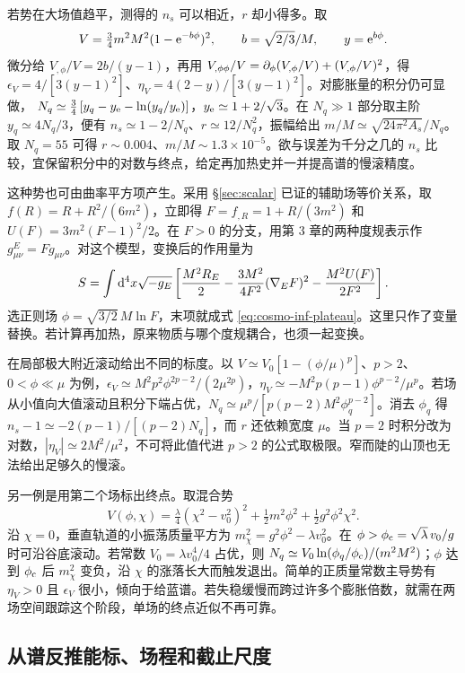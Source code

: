 若势在大场值趋平，测得的 $n_s$ 可以相近，$r$ 却小得多。取
\begin{equation}\label{eq:cosmo-inf-plateau}
 V=\tfrac34 m^2M^2(1-\mathrm{e}^{-b\phi})^2,\qquad b=\sqrt{2/3}/M,\qquad
 y=\mathrm{e}^{b\phi}.
\end{equation}
微分给 $V_{,\phi}/V=2b/(y-1)$，再用 $V_{,\phi\phi}/V=\partial_\phi(V_{,\phi}/V)+(V_{,\phi}/V)^2$，得 $\epsilon_V=4/[3(y-1)^2]$、$\eta_V=4(2-y)/[3(y-1)^2]$。对膨胀量的积分仍可显做， $N_q\simeq \tfrac34\left[y_q-y_{\rm e}-\ln(y_q/y_{\rm e})\right]$，$y_{\rm e}\simeq1+2/\sqrt3$。在 $N_q\gg1$ 部分取主阶 $y_q\simeq4N_q/3$，便有 $n_s\simeq1-2/N_q$、$r\simeq12/N_q^2$，振幅给出 $m/M\simeq\sqrt{24\pi^2 A_s}/N_q$。取 $N_q=55$ 可得 $r\sim0.004$、$m/M\sim1.3\times10^{-5}$。欲与误差为千分之几的 $n_s$ 比较，宜保留积分中的对数与终点，给定再加热史并一并提高谱的慢滚精度。

这种势也可由曲率平方项产生。采用 \S\ref{sec:scalar} 已证的辅助场等价关系，取 $f(R)=R+R^2/(6m^2)$，立即得 $F=f_{,R}=1+R/(3m^2)$ 和 $U(F)=3m^2(F-1)^2/2$。在 $F>0$ 的分支，用第 3 章的两种度规表示作 $g^{E}_{\mu\nu}=F g_{\mu\nu}$。对这个模型，变换后的作用量为
\[
 S=\int \dd^4x\sqrt{-g_E}\left[
   \frac{M^2R_E}{2}-\frac{3M^2}{4F^2}(\nabla_E F)^2
   -\frac{M^2U(F)}{2F^2}\right].
\]
选正则场 $\phi=\sqrt{3/2}\,M\ln F$，末项就成式 \eqref{eq:cosmo-inf-plateau}。这里只作了变量替换。若计算再加热，原来物质与哪个度规耦合，也须一起变换。

在局部极大附近滚动给出不同的标度。以 $V\simeq V_0[1-(\phi/\mu)^p]$、$p>2$、$0<\phi\ll\mu$ 为例，$\epsilon_V\simeq M^2p^2\phi^{2p-2}/(2\mu^{2p})$，$\eta_V\simeq-M^2p(p-1)\phi^{p-2}/\mu^p$。若场从小值向大值滚动且积分下端占优，$N_q\simeq\mu^p/[p(p-2)M^2\phi_q^{p-2}]$。消去 $\phi_q$ 得 $n_s-1\simeq-2(p-1)/[(p-2)N_q]$，而 $r$ 还依赖宽度 $\mu$。当 $p=2$ 时积分改为对数，$|\eta_V|\simeq2M^2/\mu^2$，不可将此值代进 $p>2$ 的公式取极限。窄而陡的山顶也无法给出足够久的慢滚。

另一例是用第二个场标出终点。取混合势
\[
 V(\phi,\chi)=\tfrac\lambda4(\chi^2-v_0^2)^2
             +\tfrac12m^2\phi^2+\tfrac12g^2\phi^2\chi^2 .
\]
沿 $\chi=0$，垂直轨道的小振荡质量平方为 $m_\chi^2=g^2\phi^2-\lambda v_0^2$。在 $\phi>\phi_{\rm c}=\sqrt\lambda\,v_0/g$ 时可沿谷底滚动。若常数 $V_0=\lambda v_0^4/4$ 占优，则 $N_q\simeq V_0\ln(\phi_q/\phi_{\rm c})/(m^2M^2)$；$\phi$ 达到 $\phi_{\rm c}$ 后 $m_\chi^2$ 变负，沿 $\chi$ 的涨落长大而触发退出。简单的正质量常数主导势有 $\eta_V>0$ 且 $\epsilon_V$ 很小，倾向于给蓝谱。若失稳缓慢而跨过许多个膨胀倍数，就需在两场空间跟踪这个阶段，单场的终点近似不再可靠。

\subsection{从谱反推能标、场程和截止尺度}\label{sec:cosmo-inf-scale}

